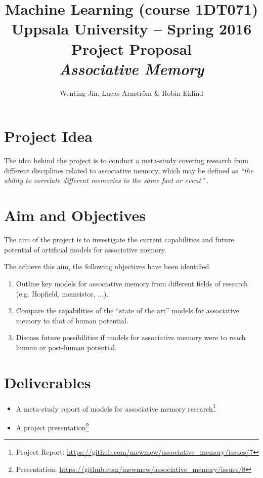 \documentclass[12pt, a4paper]{article}
\title{\textbf{Machine Learning (course 1DT071) \\
    Uppsala University -- Spring 2016 \\
    Project Proposal \\
    \textit{Associative Memory}
  }
}
\author{Wenting Jin, Lucas Arnström \& Robin Eklind}
\begin{document}
\maketitle



\section{Project Idea} %



The idea behind the project is to conduct a meta-study covering research from different disciplines related to associative memory, which may be defined as \textit{``the ability to correlate different memories to the same fact or event''} \cite{memsistor}.

\section{Aim and Objectives}

The aim of the project is to investigate the current capabilities and future potential of artificial models for associative memory.

The achieve this aim, the following objectives have been identified.

\begin{enumerate}
	\item Outline key models for associative memory from different fields of research (e.g. Hopfield, memsistor, ...).
	\item Compare the capabilities of the ``state of the art'' models for associative memory to that of human potential.
	\item Discuss future possibilities if models for associative memory were to reach human or post-human potential.
\end{enumerate}

\section{Deliverables}

\begin{itemize}
	\item A meta-study report of models for associative memory research\footnote{Project Report: \url{https://github.com/mewmew/associative_memory/issues/7}}
	\item A project presentation\footnote{Presentation: \url{https://github.com/mewmew/associative_memory/issues/8}}
\end{itemize}
\end{document}

